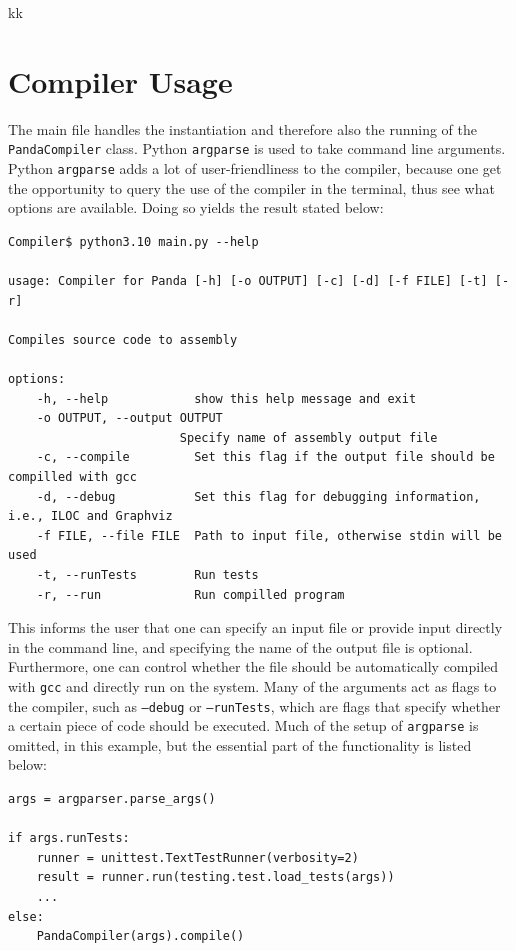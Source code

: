 kk

\newpage

\section{Compiler Usage}
The main file handles the instantiation and therefore also the running of the \texttt{PandaCompiler} class. Python \texttt{argparse} is used to take command line arguments. Python \texttt{argparse} adds a lot of user-friendliness to the compiler, because one get the opportunity to query the use of the compiler in the terminal, thus see what options are available. Doing so yields the result stated below:

\begin{verbatim}
Compiler$ python3.10 main.py --help

usage: Compiler for Panda [-h] [-o OUTPUT] [-c] [-d] [-f FILE] [-t] [-r]

Compiles source code to assembly

options:
    -h, --help            show this help message and exit
    -o OUTPUT, --output OUTPUT
                        Specify name of assembly output file
    -c, --compile         Set this flag if the output file should be compilled with gcc
    -d, --debug           Set this flag for debugging information, i.e., ILOC and Graphviz
    -f FILE, --file FILE  Path to input file, otherwise stdin will be used
    -t, --runTests        Run tests
    -r, --run             Run compilled program
\end{verbatim}

This informs the user that one can specify an input file or provide input directly in the command line, and specifying the name of the output file is optional. Furthermore, one can control whether the file should be automatically compiled with \texttt{gcc} and directly run on the system. Many of the arguments act as flags to the compiler, such as \texttt{--debug} or \texttt{--runTests}, which are flags that specify whether a certain piece of code should be executed. Much of the setup of \texttt{argparse} is omitted, in this example, but the essential part of the functionality is listed below:

\begin{verbatim}
args = argparser.parse_args()

if args.runTests:
    runner = unittest.TextTestRunner(verbosity=2)
    result = runner.run(testing.test.load_tests(args))
    ...
else:
    PandaCompiler(args).compile()
\end{verbatim}

